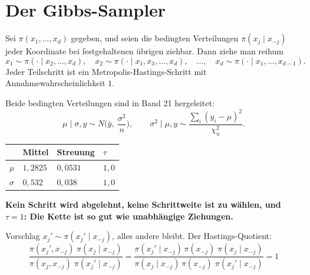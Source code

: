 \section{Der Gibbs-Sampler}

\begin{definition}
Sei $\pi(x_1,\ldots,x_d)$ gegeben, und seien die bedingten Verteilungen $\pi(x_j\mid x_{-j})$ jeder Koordinate bei festgehaltenen übrigen ziehbar. Dann ziehe man reihum
\[ x_1 \sim \pi(\cdot\mid x_2,\ldots,x_d),\quad x_2 \sim \pi(\cdot\mid x_1,x_3,\ldots,x_d),\quad \ldots,\quad x_d \sim \pi(\cdot\mid x_1,\ldots,x_{d-1}) . \]
Jeder Teilschritt ist ein Metropolis-Hastings-Schritt mit Annahmewahrscheinlichkeit $1$.
\end{definition}

\begin{merksatz}
Beide bedingten Verteilungen sind in Band 21 hergeleitet:
\[ \mu\mid\sigma,y \sim N\!\Big(\bar y,\ \frac{\sigma^2}{n}\Big), \qquad \sigma^2\mid\mu,y \sim \frac{\sum_i(y_i-\mu)^2}{\chi^2_{n}} . \]

\begin{center}
{\small
\renewcommand{\arraystretch}{1.48}
\begin{tabular}{@{}P{2.4cm}P{2.0cm}P{2.0cm}P{1.4cm}@{}}
\toprule
& \textbf{Mittel} & \textbf{Streuung} & $\tau$\\
\midrule
$\mu$ & $1{,}2825$ & $0{,}0531$ & $1{,}0$\\
$\sigma$ & $0{,}532$ & $0{,}038$ & $1{,}0$\\
\bottomrule
\end{tabular}}
\end{center}

\begin{center}
\begin{minipage}{0.9\textwidth}
\textbf{Kein Schritt wird abgelehnt, keine Schrittweite ist zu wählen, und $\tau = 1$: Die Kette ist so gut wie unabhängige Ziehungen.}
\end{minipage}
\end{center}

Vorschlag $x_j' \sim \pi(x_j'\mid x_{-j})$, alles andere bleibt. Der Hastings-Quotient:
\[ \frac{\pi(x_j', x_{-j})\;\pi(x_j\mid x_{-j})}{\pi(x_j, x_{-j})\;\pi(x_j'\mid x_{-j})} = \frac{\pi(x_j'\mid x_{-j})\,\pi(x_{-j})\;\pi(x_j\mid x_{-j})}{\pi(x_j\mid x_{-j})\,\pi(x_{-j})\;\pi(x_j'\mid x_{-j})} = 1 \]


\end{merksatz}
